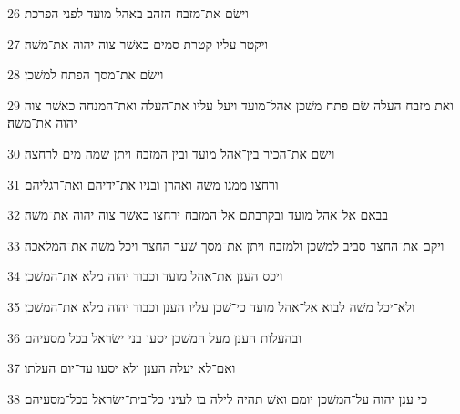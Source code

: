 \par 26 וישׂם את־מזבח הזהב באהל מועד לפני הפרכת׃
\par 27 ויקטר עליו קטרת סמים כאשׁר צוה יהוה את־משׁה׃
\par 28 וישׂם את־מסך הפתח למשׁכן׃
\par 29 ואת מזבח העלה שׂם פתח משׁכן אהל־מועד ויעל עליו את־העלה ואת־המנחה כאשׁר צוה יהוה את־משׁה׃
\par 30 וישׂם את־הכיר בין־אהל מועד ובין המזבח ויתן שׁמה מים לרחצה׃
\par 31 ורחצו ממנו משׁה ואהרן ובניו את־ידיהם ואת־רגליהם׃
\par 32 בבאם אל־אהל מועד ובקרבתם אל־המזבח ירחצו כאשׁר צוה יהוה את־משׁה׃
\par 33 ויקם את־החצר סביב למשׁכן ולמזבח ויתן את־מסך שׁער החצר ויכל משׁה את־המלאכה׃
\par 34 ויכס הענן את־אהל מועד וכבוד יהוה מלא את־המשׁכן׃
\par 35 ולא־יכל משׁה לבוא אל־אהל מועד כי־שׁכן עליו הענן וכבוד יהוה מלא את־המשׁכן׃
\par 36 ובהעלות הענן מעל המשׁכן יסעו בני ישׂראל בכל מסעיהם׃
\par 37 ואם־לא יעלה הענן ולא יסעו עד־יום העלתו׃
\par 38 כי ענן יהוה על־המשׁכן יומם ואשׁ תהיה לילה בו לעיני כל־בית־ישׂראל בכל־מסעיהם׃



